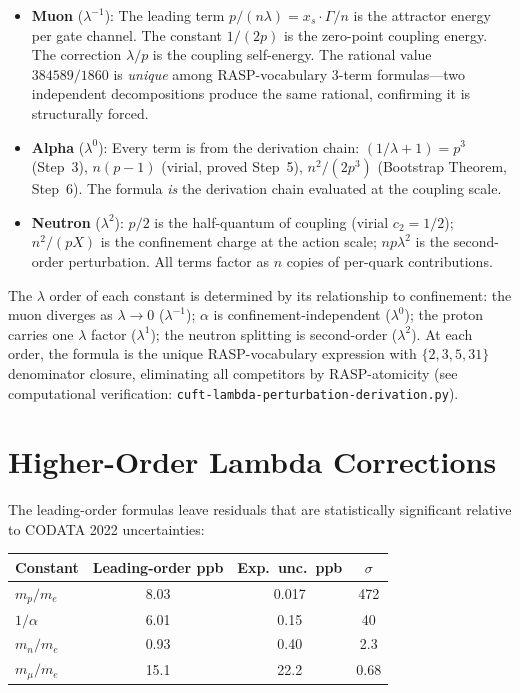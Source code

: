\documentclass[12pt,a4paper]{article}
\theoremstyle{definition}
\begin{document}
\begin{itemize}
\item \textbf{Muon} ($\lambda^{-1}$): The leading term
  $p/(n\lambda) = x_s \cdot \Gamma/n$ is the attractor energy per gate
  channel. The constant $1/(2p)$ is the zero-point coupling energy.
  The correction $\lambda/p$ is the coupling self-energy. The rational
  value $384589/1860$ is \emph{unique} among RASP-vocabulary 3-term
  formulas---two independent decompositions produce the same rational,
  confirming it is structurally forced.

\item \textbf{Alpha} ($\lambda^0$): Every term is from the derivation
  chain: $(1/\lambda+1) = p^3$ (Step~3), $n(p-1)$ (virial, proved Step~5),
  $n^2/(2p^3)$ (Bootstrap Theorem, Step~6). The formula \emph{is} the
  derivation chain evaluated at the coupling scale.

\item \textbf{Neutron} ($\lambda^2$): $p/2$ is the half-quantum of coupling
  (virial $c_2 = 1/2$); $n^2/(pX)$ is the confinement charge at the action
  scale; $np\lambda^2$ is the second-order perturbation. All terms factor as
  $n$ copies of per-quark contributions.
\end{itemize}

The $\lambda$ order of each constant is determined by its relationship to
confinement: the muon diverges as $\lambda \to 0$ ($\lambda^{-1}$);
$\alpha$ is confinement-independent ($\lambda^0$); the proton carries one
$\lambda$ factor ($\lambda^1$); the neutron splitting is second-order
($\lambda^2$). At each order, the formula is the unique RASP-vocabulary
expression with $\{2,3,5,31\}$ denominator closure, eliminating all
competitors by RASP-atomicity (see computational verification:
\texttt{cuft-lambda-perturbation-derivation.py}).

\section{Higher-Order Lambda Corrections}

The leading-order formulas leave residuals that are statistically
significant relative to CODATA 2022 uncertainties:

\begin{center}
\begin{tabular}{lccc}
\toprule
Constant & Leading-order ppb & Exp.\ unc.\ ppb & $\sigma$ \\
\midrule
$m_p/m_e$   & 8.03 & 0.017 & 472 \\
$1/\alpha$  & 6.01 & 0.15  &  40 \\
$m_n/m_e$   & 0.93 & 0.40  & 2.3 \\
$m_\mu/m_e$ & 15.1 & 22.2  & 0.68 \\
\bottomrule
\end{tabular}
\end{center}
\end{document}
